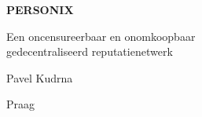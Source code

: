 \thispagestyle{empty}
\begin{center}
  {\sffamily\bfseries\fontsize{34}{40}\selectfont PERSONIX\par}
  \vspace{2.2em}
  {\rmfamily\large Een oncensureerbaar en onomkoopbaar\\[0.25em]
   gedecentraliseerd reputatienetwerk\par}
\end{center}
\begin{center}
  {\rmfamily\Large Pavel Kudrna\par}
  \vspace{0.45em}
  {\rmfamily\small Praag\quad\textbullet{}\par}
\end{center}
\clearpage
